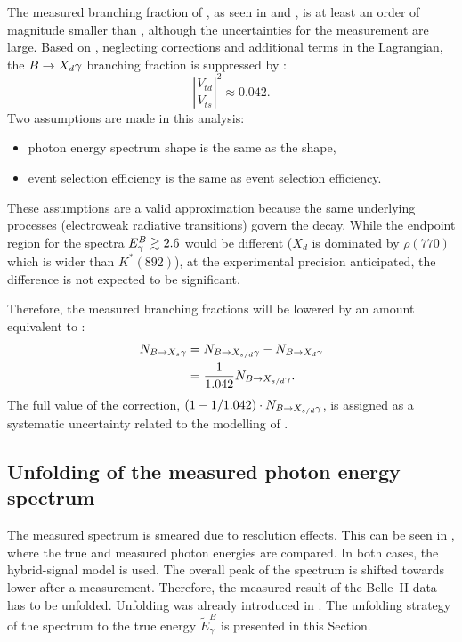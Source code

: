 The measured branching fraction of \BtoXdgamma, 
as seen in  and , is at least an order of magnitude smaller than \BtoXsgamma,
although the uncertainties for the measurement are large.
Based on , neglecting corrections and additional terms in the Lagrangian, the $\BtoXdgamma$ branching fraction
is suppressed by \cite{Workman:2022ynf}:
\begin{equation}\label{eq:btodgamma_suppression}
    \left|\frac{V_{td}}{V_{ts}}\right|^2 \approx 0.042.
\end{equation}
Two assumptions are made in this analysis:
\begin{itemize}
    \item \BtoXdgamma photon energy spectrum shape is the same as the \BtoXsgamma shape,
    \item \BtoXdgamma event selection efficiency is the same as \BtoXsgamma event selection efficiency.
\end{itemize}
These assumptions are a valid approximation because the same underlying processes (electroweak radiative transitions) govern the decay.
While the endpoint region for the spectra ${E^B_{\gamma}}\gtrsim2.6$ would be different  ($X_d$ is dominated by $\rho(770)$ 
which is wider than $K^*(892)$), at the experimental precision anticipated, the difference is not expected to be significant.

Therefore, the measured \BtoXsdgamma branching fractions will be lowered by an amount equivalent to :
\begin{align}\label{eq:btodgamma_subtraction}
    \begin{split}
    N_{\BtoXsgamma} &= N_{\BtoXsdgamma} - N_{\BtoXdgamma}\\
                    &=\frac{1}{1.042} N_{\BtoXsdgamma}.
    \end{split}
\end{align}
The full value of the correction, $(1-1/1.042) \cdot N_{\BtoXsdgamma}$, is assigned as a systematic uncertainty related to the modelling of \BtoXdgamma.

\subsection{Unfolding of the measured photon energy spectrum} \label{sec:signal_unfolding}

The measured \EB spectrum is smeared due to resolution effects.
This can be seen in , where the true and measured photon energies are compared.
In both cases, the hybrid-signal model is used.
The overall peak of the spectrum is shifted towards lower-\EB after a measurement.
Therefore, the measured result of the Belle~II data has to be unfolded.
Unfolding was already introduced in .
The unfolding strategy of the \EB spectrum to the true energy $\tilde{E}_{\gamma}^B$ is presented in this Section.

